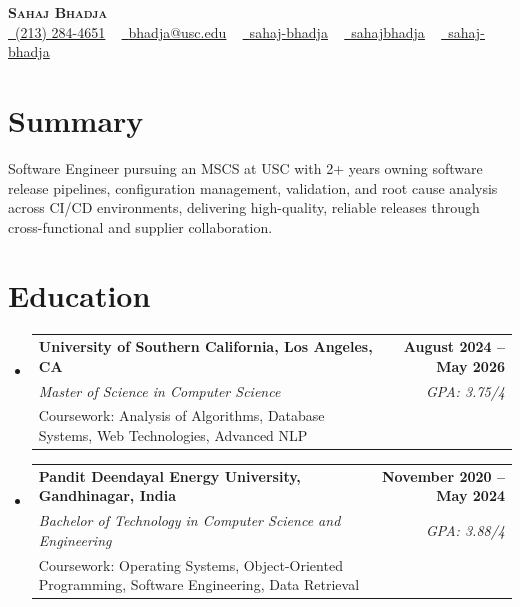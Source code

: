 \documentclass[letterpaper,10pt]{article}
\makeatletter
\newcommand{\resumeEduSubheading}[5]{\vspace{-1pt}\item\begin{tabular*}{1.0\textwidth}[t]{l@{\extracolsep{\fill}}r}\textbf{#1} & \textbf{\small #2} \\\textit{\small #3} & \textit{\small #4} \\\small #5 & \\\end{tabular*}\vspace{-4pt}}
\newcommand{\resumeSubHeadingListStart}{\begin{itemize}[leftmargin=0.0in, label={}]}
\newcommand{\resumeSubHeadingListEnd}{\end{itemize}}
\makeatother
\begin{document}
\begin{center}
{\Huge \scshape \textbf{Sahaj Bhadja}} \\ \vspace{1pt}
\small \href{tel:(213) 284-4651}{\faPhone\ \underline{(213) 284-4651}} ~ \href{mailto: bhadja@usc.edu}{\raisebox{-0.2\height}\faEnvelope\ \underline{bhadja@usc.edu}} ~
\href{https://www.linkedin.com/in/sahaj-bhadja/}{\raisebox{-0.2\height}\faLinkedin\ \underline{sahaj-bhadja}} ~ \href{https://github.com/SAHAJ-BHADJA}{\raisebox{-0.2\height}\faGithub\ \underline{sahajbhadja}} ~
\href{https://sahaj-bhadja.vercel.app/}{\raisebox{-0.2\height}\faGlobe\ \underline{sahaj-bhadja}}
\end{center}
\vspace{-16pt}
\section{Summary}
\begin{itemize}[leftmargin=0.15in, label={}]
\small{\item{Software Engineer pursuing an MSCS at USC with 2+ years owning software release pipelines, configuration management, validation, and root cause analysis across CI/CD environments, delivering high-quality, reliable releases through cross-functional and supplier collaboration.}}
\end{itemize}
\vspace{-6pt}
\section{Education}
\resumeSubHeadingListStart
\resumeEduSubheading{University of Southern California, Los Angeles, CA}{August 2024 -- May 2026}{Master of Science in Computer Science}{GPA: 3.75/4}{Coursework: Analysis of Algorithms, Database Systems, Web Technologies, Advanced NLP}
\vspace{-9pt}
\resumeEduSubheading{Pandit Deendayal Energy University, Gandhinagar, India}{November 2020 -- May 2024}{Bachelor of Technology in Computer Science and Engineering}{GPA: 3.88/4}{Coursework: Operating Systems, Object-Oriented Programming, Software Engineering, Data Retrieval}
\resumeSubHeadingListEnd
\vspace{-6pt}
\end{document}
